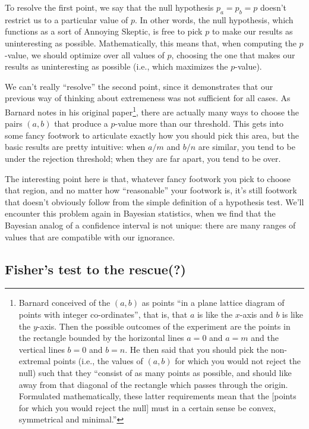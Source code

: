\documentclass{book}
\begin{document}
To resolve the first point, we say that the null hypothesis
\(p_a = p_b = p\) doesn't restrict us to a particular value of \(p\). In
other words, the null hypothesis, which functions as a sort of Annoying
Skeptic, is free to pick \(p\) to make our results as uninteresting as
possible. Mathematically, this means that, when computing the
\(p\)-value, we should optimize over all values of \(p\), choosing the
one that makes our results as uninteresting as possible (i.e., which
maximizes the \(p\)-value).

We can't really ``resolve'' the second point, since it demonstrates that
our previous way of thinking about extremeness was not sufficient for
all cases. As Barnard notes in his original paper\footnote{Barnard
  conceived of the \((a, b)\) as points ``in a plane lattice diagram of
  points with integer co-ordinates'', that is, that \(a\) is like the
  \(x\)-axis and \(b\) is like the \(y\)-axis. Then the possible
  outcomes of the experiment are the points in the rectangle bounded by
  the horizontal lines \(a = 0\) and \(a = m\) and the vertical lines
  \(b = 0\) and \(b = n\). He then said that you should pick the
  non-extremal points (i.e., the values of \((a, b)\) for which you
  would not reject the null) such that they ``consist of as many points
  as possible, and should like away from that diagonal of the rectangle
  which passes through the origin. Formulated mathematically, these
  latter requirements mean that the {[}points for which you would reject
  the null{]} must in a certain sense be convex, symmetrical and
  minimal.''}, there are actually many ways to choose the pairs
\((a, b)\) that produce a \(p\)-value more than our threshold. This gets
into some fancy footwork to articulate exactly how you should pick this
area, but the basic results are pretty intuitive: when \(a/m\) and
\(b/n\) are similar, you tend to be under the rejection threshold; when
they are far apart, you tend to be over.

The interesting point here is that, whatever fancy footwork you pick to
choose that region, and no matter how ``reasonable'' your footwork is,
it's still footwork that doesn't obviously follow from the simple
definition of a hypothesis test. We'll encounter this problem again in
Bayesian statistics, when we find that the Bayesian analog of a
confidence interval is not unique: there are many ranges of values that
are compatible with our ignorance.

\subsection{Fisher's test to the
rescue(?)}\label{fishers-test-to-the-rescue}
\end{document}
